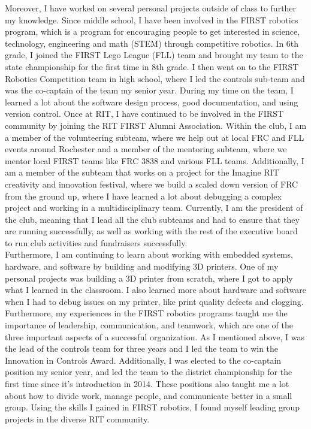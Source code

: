 \documentclass[line,margin]{res}
\begin{document}
\begin{resume}
\begin{adjustwidth}{-92pt}{0pt}
		\noindent
		Moreover, I have worked on several personal projects outside of class to further my knowledge. Since middle school, I have been involved in the FIRST robotics program, which is a program for encouraging people to get interested in science, technology, engineering and math (STEM) through competitive robotics. In 6th grade, I joined the FIRST Lego League (FLL) team and brought my team to the state championship for the first time in 8th grade. I then went on to the FIRST Robotics Competition team in high school, where I led the controls sub-team and was the co-captain of the team my senior year. During my time on the team, I learned a lot about the software design process, good documentation, and using version control. Once at RIT, I have continued to be involved in the FIRST community by joining the RIT FIRST Alumni Association. Within the club, I am a member of the volunteering subteam, where we help out at local FRC and FLL events around Rochester and a member of the mentoring subteam, where we mentor local FIRST teams like FRC 3838 and various FLL teams. Additionally, I am a member of the subteam that works on a project for the Imagine RIT creativity and innovation festival, where we build a scaled down version of FRC from the ground up, where I have learned a lot about debugging a complex project and working in a multidisciplinary team. Currently, I am the president of the club, meaning that I lead all the club subteams and had to ensure that they are running successfully, as well as working with the rest of the executive board to run club activities and fundraisers successfully. \\

		\noindent
		Furthermore, I am continuing to learn about working with embedded systems, hardware, and software by building and modifying 3D printers. One of my personal projects was building a 3D printer from scratch, where I got to apply what I learned in the classroom. I also learned more about hardware and software when I had to debug issues on my printer, like print quality defects and clogging. \\

		\noindent
		Furthermore, my experiences in the FIRST robotics programs taught me the importance of leadership, communication, and teamwork, which are one of the three important aspects of a successful organization. As I mentioned above, I was the lead of the controls team for three years and I led the team to win the Innovation in Controls Award. Additionally, I was elected to the co-captain position my senior year, and led the team to the district championship for the first time since it's introduction in 2014. These positions also taught me a lot about how to divide work, manage people, and communicate better in a small group. Using the skills I gained in FIRST robotics, I found myself leading group projects in the diverse RIT community. \\


\end{adjustwidth}
\end{resume}
\end{document}
